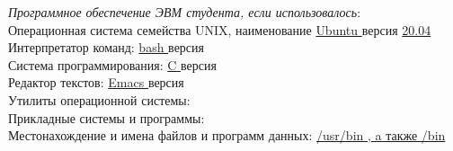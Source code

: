 \documentclass[10pt]{report}
\begin{document}
\begin{spacing}{1}
        \indent \textit{Программное обеспечение ЭВМ студента, если использовалось}:  \\ 
        \indent Операционная система семейства UNIX, наименование \underline{ Ubuntu } версия \underline{ 20.04 }\\
        \indent Интерпретатор  команд: \underline{ bash } версия \tlinee{0.5in}\\
        \indent Система программирования: \underline{ C } версия \tlinee{0.5in}\\
        \indent Редактор текстов: \underline{ Emacs } версия \tlinee{0.5in}\\
        \indent Утилиты операционной системы: \tlinee{4in}\\
        \indent Прикладные системы и программы: \tlinee{3.7in}\\
        \indent Местонахождение и имена файлов и программ данных: \underline{ /usr/bin , a также /bin }\\

    \end{spacing}
    \newpage
\end{document}
